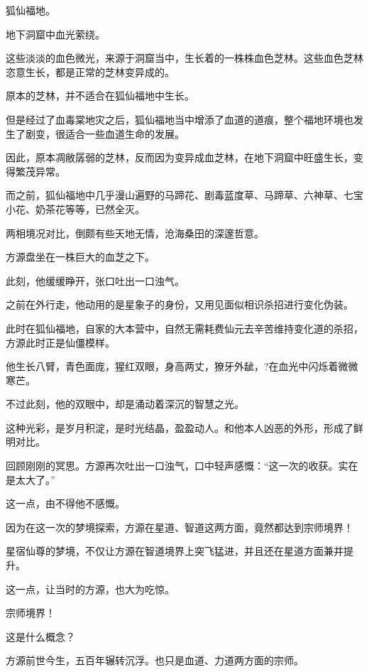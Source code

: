 
\begin{this_body}



狐仙福地。

地下洞窟中血光萦绕。

这些淡淡的血色微光，来源于洞窟当中，生长着的一株株血色芝林。这些血色芝林恣意生长，都是正常的芝林变异成的。

原本的芝林，并不适合在狐仙福地中生长。

但是经过了血毒棠地灾之后，狐仙福地当中增添了血道的道痕，整个福地环境也发生了剧变，很适合一些血道生命的发展。

因此，原本凋敝孱弱的芝林，反而因为变异成血芝林，在地下洞窟中旺盛生长，变得繁茂异常。

而之前，狐仙福地中几乎漫山遍野的马蹄花、剧毒蓝度草、马蹄草、六神草、七宝小花、奶茶花等等，已然全灭。

两相境况对比，倒颇有些天地无情，沧海桑田的深邃哲意。

方源盘坐在一株巨大的血芝之下。

此刻，他缓缓睁开，张口吐出一口浊气。

之前在外行走，他动用的是星象子的身份，又用见面似相识杀招进行变化伪装。

此时在狐仙福地，自家的大本营中，自然无需耗费仙元去辛苦维持变化道的杀招，方源此时正是仙僵模样。

他生长八臂，青色面庞，猩红双眼，身高两丈，獠牙外龇，?在血光中闪烁着微微寒芒。

不过此刻，他的双眼中，却是涌动着深沉的智慧之光。

这种光彩，是岁月积淀，是时光结晶，盈盈动人。和他本人凶恶的外形，形成了鲜明对比。

回顾刚刚的冥思。方源再次吐出一口浊气，口中轻声感慨：“这一次的收获。实在是太大了。”

这一点，由不得他不感慨。

因为在这一次的梦境探索，方源在星道、智道这两方面，竟然都达到宗师境界！

星宿仙尊的梦境，不仅让方源在智道境界上突飞猛进，并且还在星道方面兼并提升。

这一点，让当时的方源，也大为吃惊。

宗师境界！

这是什么概念？

方源前世今生，五百年辗转沉浮。也只是血道、力道两方面的宗师。


\end{this_body}
